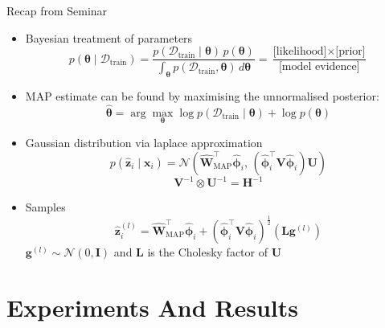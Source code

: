 \documentclass[aspectratio=169,xcolor=dvipsnames]{beamer}
\begin{document}
\begin{frame}{Recap from Seminar}
    \begin{itemize}
        \item<1-> Bayesian treatment of parameters
        \[
        p(\boldsymbol{\theta} \mid \mathcal{D}_{\text{train}})
        = \frac{p(\mathcal{D}_{\text{train}} \mid \boldsymbol{\theta}) \, p(\boldsymbol{\theta})}{\int_{\boldsymbol{\theta}} p(\mathcal{D}_{\text{train}}, \boldsymbol{\theta}) \, d\boldsymbol{\theta}}
        = \frac{\text{[likelihood]} \times \text{[prior]}}{\text{[model evidence]}}
    \]
        \item<2-> MAP estimate can be found by maximising the unnormalised posterior:
        \[
        \hat{\boldsymbol{\theta}} = \arg\max_{\boldsymbol{\theta}} \log p(\mathcal{D}_{\text{train}} \mid \boldsymbol{\theta}) + \log p(\boldsymbol{\theta})
              \]
        \item<3-> Gaussian distribution via laplace approximation
        \[
        p(\hat{\mathbf{z}}_i \mid \mathbf{x}_i) = \mathcal{N}(\hat{\mathbf{W}}_{\text{MAP}}^\top \hat{\boldsymbol{\phi}}_i, \, (\hat{\boldsymbol{\phi}}_i^\top \mathbf{V} \hat{\boldsymbol{\phi}}_i) \mathbf{U})
        \]
        \[
            \mathbf{V}^{-1} \otimes \mathbf{U}^{-1} = \mathbf{H}^{-1}
        \]
        \item<4-> Samples
        \[
         \hat{\mathbf{z}}_i^{(l)} = \hat{\mathbf{W}}_{\text{MAP}}^\top \hat{\boldsymbol{\phi}}_i + (\hat{\boldsymbol{\phi}}_i^\top \mathbf{V} \hat{\boldsymbol{\phi}}_i)^{\frac{1}{2}} (\mathbf{L} \mathbf{g}^{(l)})
        \]
        {\footnotesize \quad $\mathbf{g}^{(l)} \sim \mathcal{N}(0, \mathbf{I})$ and $\mathbf{L}$ is the Cholesky factor of $\mathbf{U}$}
    \end{itemize}
\end{frame}

\section{Experiments And Results}
\end{document}
